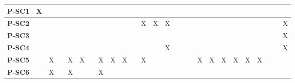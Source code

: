 \documentclass[12pt]{article}
\begin{document}
\begin{table}[H]
\begin{adjustwidth}{-1.4in}{-1in}
{\begin{tabular}{c|c|c|c|c|c|c|c|c|c|c|c|c|c|c|c|c|c|c|c|c|c|c|c|c|c|}
  \multicolumn{1}{|l|}{\textbf{P-SC1}}   &       X      &              &              &              &              &              &              &              &              &              &              &              &              &              &              &              &              &              &              &              &              &              &              &              &               \\ \hline
  \multicolumn{1}{|l|}{\textbf{P-SC2}}   &              &              &              &              &              &              &              &              &              &              &       X      &       X      &       X      &              &              &              &              &              &              &              &              &              &              &              &       X       \\ \hline
  \multicolumn{1}{|l|}{\textbf{P-SC3}}   &              &              &              &              &              &              &              &              &              &              &              &              &              &              &              &              &              &              &              &              &              &              &              &              &       X       \\ \hline
  \multicolumn{1}{|l|}{\textbf{P-SC4}}   &              &              &              &              &              &              &              &              &              &              &              &              &       X      &              &              &              &              &              &              &              &              &              &              &              &       X       \\ \hline
  \multicolumn{1}{|l|}{\textbf{P-SC5}}   &              &       X      &              &       X      &       X      &              &       X      &       X      &       X      &              &       X      &              &              &              &              &              &       X      &       X      &       X      &       X      &       X      &       X      &              &              &               \\ \hline
  \multicolumn{1}{|l|}{\textbf{P-SC6}}   &              &       X      &              &       X      &              &              &       X      &              &              &              &              &              &              &              &              &              &              &              &              &              &              &              &              &              &               \\ \hline

\end{tabular}}
\end{adjustwidth}
\end{table}
\end{document}
